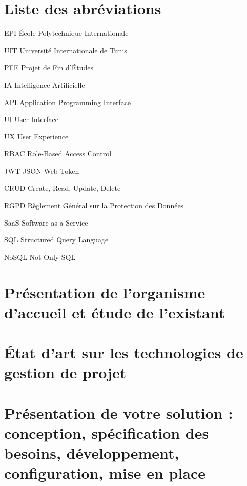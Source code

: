 \documentclass[12pt,a4paper]{report}
\begin{document}
\chapter*{Liste des abréviations}
\begin{acronym}
    \item[EPI] École Polytechnique Internationale
    \item[UIT] Université Internationale de Tunis
    \item[PFE] Projet de Fin d'Études
    \item[IA] Intelligence Artificielle
    \item[API] Application Programming Interface
    \item[UI] User Interface
    \item[UX] User Experience
    \item[RBAC] Role-Based Access Control
    \item[JWT] JSON Web Token
    \item[CRUD] Create, Read, Update, Delete
    \item[RGPD] Règlement Général sur la Protection des Données
    \item[SaaS] Software as a Service
    \item[SQL] Structured Query Language
    \item[NoSQL] Not Only SQL
\end{acronym}
\newpage



\chapter{Présentation de l'organisme d'accueil et étude de l'existant}


\chapter{État d'art sur les technologies de gestion de projet}


\chapter{Présentation de votre solution : conception, spécification des besoins, développement, configuration, mise en place}


\end{document}
